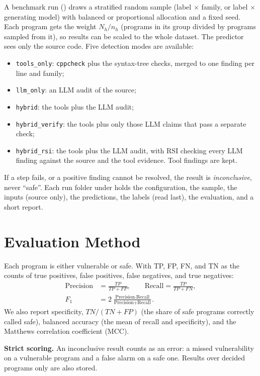 \documentclass[conference]{IEEEtran}
\begin{document}
A benchmark run () draws a stratified random sample
(label $\times$ family, or label $\times$ generating model) with balanced or
proportional allocation and a fixed seed. Each program gets the weight
$N_h/n_h$ (programs in its group divided by programs sampled from it), so results
can be scaled to the whole dataset. The predictor sees only the source code.
Five detection modes are available:
\begin{itemize}
  \item \texttt{tools\_only}: \texttt{cppcheck} plus the syntax-tree checks,
        merged to one finding per line and family;
  \item \texttt{llm\_only}: an LLM audit of the source;
  \item \texttt{hybrid}: the tools plus the LLM audit;
  \item \texttt{hybrid\_verify}: the tools plus only those LLM claims that pass a
        separate check;
  \item \texttt{hybrid\_rsi}: the tools plus the LLM audit, with RSI checking
        every LLM finding against the source and the tool evidence. Tool
        findings are kept.
\end{itemize}
If a step fails, or a positive finding cannot be resolved, the result is
\emph{inconclusive}, never ``safe''. Each run folder under
 holds the configuration, the sample, the inputs (source
only), the predictions, the labels (read last), the evaluation, and a short
report.

\section{Evaluation Method}
Each program is either vulnerable or safe. With TP, FP, FN, and TN as the counts
of true positives, false positives, false negatives, and true negatives:
\begin{align}
\text{Precision} &= \frac{TP}{TP+FP}, \qquad
\text{Recall} = \frac{TP}{TP+FN}, \\
F_1 &= 2\,\frac{\text{Precision}\cdot\text{Recall}}{\text{Precision}+\text{Recall}}.
\end{align}
We also report specificity, $TN/(TN+FP)$ (the share of safe programs correctly
called safe), balanced accuracy (the mean of recall and specificity), and the
Matthews correlation coefficient (MCC).

\textbf{Strict scoring.} An inconclusive result counts as an error: a missed
vulnerability on a vulnerable program and a false alarm on a safe one. Results
over decided programs only are also stored.
\end{document}
